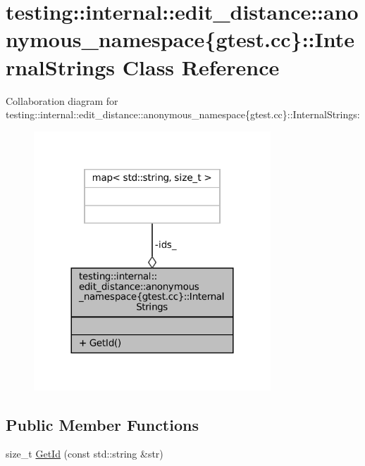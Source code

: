 \hypertarget{classtesting_1_1internal_1_1edit__distance_1_1anonymous__namespace_02gtest_8cc_03_1_1InternalStrings}{}\section{testing\+:\+:internal\+:\+:edit\+\_\+distance\+:\+:anonymous\+\_\+namespace\{gtest.\+cc\}\+:\+:Internal\+Strings Class Reference}
\label{classtesting_1_1internal_1_1edit__distance_1_1anonymous__namespace_02gtest_8cc_03_1_1InternalStrings}


Collaboration diagram for testing\+:\+:internal\+:\+:edit\+\_\+distance\+:\+:anonymous\+\_\+namespace\{gtest.\+cc\}\+:\+:Internal\+Strings\+:
\nopagebreak
\begin{figure}[H]
\begin{center}
\leavevmode
\includegraphics[width=252pt]{classtesting_1_1internal_1_1edit__distance_1_1anonymous__namespace_02gtest_8cc_03_1_1InternalStrings__coll__graph}
\end{center}
\end{figure}
\subsection*{Public Member Functions}
\begin{DoxyCompactItemize}
\item 
size\+\_\+t \hyperlink{classtesting_1_1internal_1_1edit__distance_1_1anonymous__namespace_02gtest_8cc_03_1_1InternalStrings_a19e907f1050d89f17c6eabb1a04a25bc}{Get\+Id} (const std\+::string \&str)
\end{DoxyCompactItemize}
